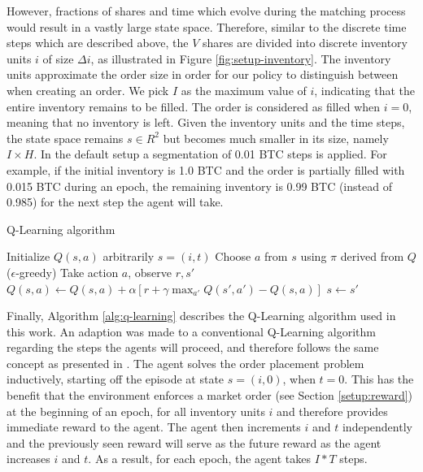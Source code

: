 However, fractions of shares and time which evolve during the matching process would result in a vastly large state space.
Therefore, similar to the discrete time steps which are described above, the $V$ shares are divided into discrete inventory units $i$ of size $\Delta{i}$, as illustrated in Figure \ref{fig:setup-inventory}.
The inventory units approximate the order size in order for our policy to distinguish between when creating an order.
We pick $I$ as the maximum value of $i$, indicating that the entire inventory remains to be filled.
The order is considered as filled when $i=0$, meaning that no inventory is left.
Given the inventory units and the time steps, the state space remains $s \in R^2$ but becomes much smaller in its size, namely $I \times H$.
In the default setup a segmentation of 0.01 BTC steps is applied.
For example, if the initial inventory is 1.0 BTC and the order is partially filled with 0.015 BTC during an epoch, the remaining inventory is 0.99 BTC (instead of 0.985) for the next step the agent will take.

\begin{algorithm}
\caption{Q-Learning algorithm}\label{alg:q-learning}
\begin{algorithmic}[1]
\State Initialize $Q(s,a)$ arbitrarily
\State $s=(i, t)$
\State Choose $a$ from $s$ using $\pi$ derived from $Q$ ($\epsilon$-greedy)
\State Take action $a$, observe $r, s'$
\State $Q(s,a) \gets Q(s,a)+ \alpha[r+ \gamma \max_{a'}Q(s',a')-Q(s,a)]$
\State $s \gets s'$
\EndFor
\EndFor
\EndFor
\end{algorithmic}
\end{algorithm}
Finally, Algorithm \ref{alg:q-learning} describes the Q-Learning algorithm used in this work.
An adaption was made to a conventional Q-Learning algorithm\cite{sutton1998reinforcement} regarding the steps the agents will proceed, and therefore follows the same concept as presented in \cite{nevmyvaka2006reinforcement}.
The agent solves the order placement problem inductively, starting off the episode at state $s=(i,0)$, when $t=0$.
This has the benefit that the environment enforces a market order (see Section \ref{setup:reward}) at the beginning of an epoch, for all inventory units $i$ and therefore provides immediate reward to the agent.
The agent then increments $i$ and $t$ independently and the previously seen reward will serve as the future reward as the agent increases $i$ and $t$.
As a result, for each epoch, the agent takes $I*T$ steps.

